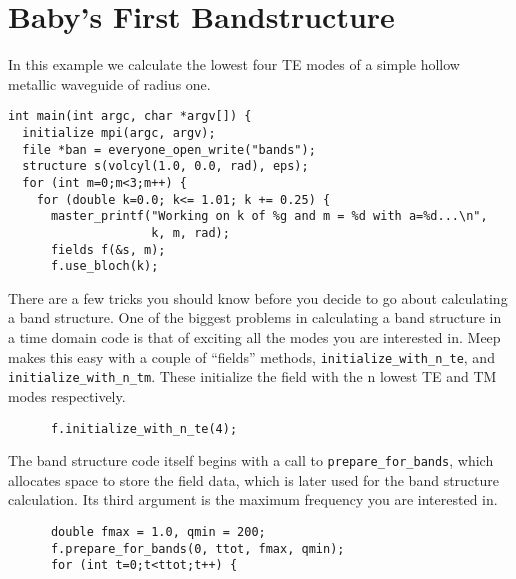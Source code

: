 \begin{comment}
/*
\end{comment}
\section{Baby's First Bandstructure}
\begin{comment}
*/
\end{comment}

\begin{comment}
#include <stdio.h>
#include <stdlib.h>
#include <meep.hpp>
using namespace meep;

double eps(const vec &) {
  return 1.0;
}
const int rad = 10;
const int ttot = 1500*rad;
\end{comment}

In this example we calculate the lowest four TE modes of a simple hollow
metallic waveguide of radius one.

\begin{verbatim}
int main(int argc, char *argv[]) {
  initialize mpi(argc, argv);
  file *ban = everyone_open_write("bands");
  structure s(volcyl(1.0, 0.0, rad), eps);
  for (int m=0;m<3;m++) {
    for (double k=0.0; k<= 1.01; k += 0.25) {
      master_printf("Working on k of %g and m = %d with a=%d...\n",
                    k, m, rad);
      fields f(&s, m);
      f.use_bloch(k);
\end{verbatim}

There are a few tricks you should know before you decide to go about
calculating a band structure.  One of the biggest problems in calculating a
band structure in a time domain code is that of exciting all the modes you
are interested in.  Meep makes this easy with a couple of ``fields''
methods, \verb-initialize_with_n_te-, and \verb-initialize_with_n_tm-.
These initialize the field with the n lowest TE and TM modes respectively.

\begin{verbatim}
      f.initialize_with_n_te(4);
\end{verbatim}

The band structure code itself begins with a call to
\verb-prepare_for_bands-, which allocates space to store the field
data, which is later used for the band structure calculation.  Its third
argument is the maximum frequency you are interested in.

\begin{verbatim}
      double fmax = 1.0, qmin = 200;
      f.prepare_for_bands(0, ttot, fmax, qmin);
      for (int t=0;t<ttot;t++) {
\end{verbatim}

